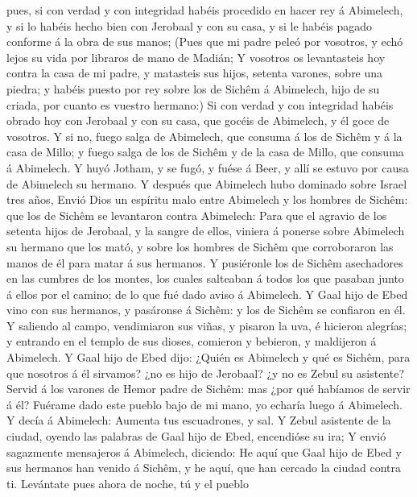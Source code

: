 pues, si con verdad y con integridad habéis procedido en hacer rey á
Abimelech, y si lo habéis hecho bien con Jerobaal y con su casa, y si le
habéis pagado conforme á la obra de sus manos;  (Pues que
mi padre peleó por vosotros, y echó lejos su vida por libraros de mano
de Madián;  Y vosotros os levantasteis hoy contra la casa
de mi padre, y matasteis sus hijos, setenta varones, sobre una piedra; y
habéis puesto por rey sobre los de Sichêm á Abimelech, hijo de su
criada, por cuanto es vuestro hermano:)  Si con verdad y
con integridad habéis obrado hoy con Jerobaal y con su casa, que gocéis
de Abimelech, y él goce de vosotros.  Y si no, fuego
salga de Abimelech, que consuma á los de Sichêm y á la casa de Millo; y
fuego salga de los de Sichêm y de la casa de Millo, que consuma á
Abimelech.  Y huyó Jotham, y se fugó, y fuése á Beer, y
allí se estuvo por causa de Abimelech su hermano.  Y
después que Abimelech hubo dominado sobre Israel tres años,
 Envió Dios un espíritu malo entre Abimelech y los
hombres de Sichêm: que los de Sichêm se levantaron contra Abimelech:
 Para que el agravio de los setenta hijos de Jerobaal, y
la sangre de ellos, viniera á ponerse sobre Abimelech su hermano que los
mató, y sobre los hombres de Sichêm que corroboraron las manos de él
para matar á sus hermanos.  Y pusiéronle los de Sichêm
asechadores en las cumbres de los montes, los cuales salteaban á todos
los que pasaban junto á ellos por el camino; de lo que fué dado aviso á
Abimelech.  Y Gaal hijo de Ebed vino con sus hermanos, y
pasáronse á Sichêm: y los de Sichêm se confiaron en él. 
Y saliendo al campo, vendimiaron sus viñas, y pisaron la uva, é hicieron
alegrías; y entrando en el templo de sus dioses, comieron y bebieron, y
maldijeron á Abimelech.  Y Gaal hijo de Ebed dijo: ¿Quién
es Abimelech y qué es Sichêm, para que nosotros á él sirvamos? ¿no es
hijo de Jerobaal? ¿y no es Zebul su asistente? Servid á los varones de
Hemor padre de Sichêm: mas ¿por qué habíamos de servir á él?
 Fuérame dado este pueblo bajo de mi mano, yo echaría
luego á Abimelech. Y decía á Abimelech: Aumenta tus escuadrones, y sal.
 Y Zebul asistente de la ciudad, oyendo las palabras de
Gaal hijo de Ebed, encendióse su ira;  Y envió sagazmente
mensajeros á Abimelech, diciendo: He aquí que Gaal hijo de Ebed y sus
hermanos han venido á Sichêm, y he aquí, que han cercado la ciudad
contra ti.  Levántate pues ahora de noche, tú y el pueblo
